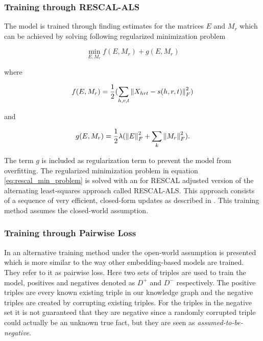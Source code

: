 \subsubsection{Training through RESCAL-ALS}
The model is trained through finding estimates for the matrices $E$ and $M_r$ which can be achieved by solving following regularized minimization problem

\begin{equation}
\label{eq:rescal_min_problem}
\min_{E, M_r} f(E,M_r) + g(E, M_r)
\end{equation}

where 

\begin{equation}
\label{eq:rescal_als}
f(E,M_r)=\frac{1}{2}(\sum_{h,r,t} \left\lVert X_{hrt}-s(h,r,t)\right\rVert^2_F)
\end{equation}

and 

\begin{equation}
\label{eq:rescal_regu}
g(E, M_r)=\frac{1}{2}\lambda(\left\lVert E\right\rVert^2_F + \sum_k\left\lVert M_r\right\rVert^2_F).
\end{equation}

The term $g$ is included as regularization term to prevent the model from overfitting. The regularized minimization problem in equation \ref{eq:rescal_min_problem} is solved with an for RESCAL adjusted version of the alternating least-squares approach called RESCAL-ALS. This approach consists of a sequence of very efficient, closed-form updates as described in \cite{nickel_factorizing_2012}. This training method assumes the closed-world assumption.

\subsubsection{Training through Pairwise Loss}
In \cite{nickel_review_2015} an alternative training method under the open-world assumption is presented which is more similar to the way other embedding-based models are trained. They refer to it as pairwise loss. Here two sets of triples are used to train the model, positives and negatives denoted as $D^+$ and $D^-$ respectively. The positive triples are every known existing triple in our knowledge graph and the negative triples are created by corrupting existing triples. For the triples in the negative set it is not guaranteed that they are negative since a randomly corrupted triple could actually be an unknown true fact, but they are seen as \textit{assumed-to-be-negative}.

